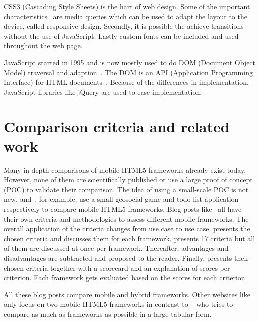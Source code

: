 \documentclass[a4paper]{artikel3}
\begin{document}
CSS3 (Cascading Style Sheets) is the hart of web design.
Some of the important characteristics~\cite{MacDonald2011} are media queries which can be used to adapt the layout to the device, called responsive design.
Secondly, it is possible the achieve transitions without the use of JavaScript.
Lastly custom fonts can be included and used throughout the web page.

JavaScript started in 1995 and is now mostly used to do DOM (Document Object Model) traversal and adaption~\cite{PhilDutson2012}.
The DOM is an API (Application Programming Interface) for HTML documents~\cite{Hegaret2004}.
Because of the differences in implementation, JavaScript libraries like jQuery are used to ease implementation.

\section{Comparison criteria and related work}
\label{sec:comparisoncriteria}

Many in-depth comparisons of mobile HTML5 frameworks already exist today.  
However, none of them are scientifically published or use a large proof of concept (POC) to validate their comparison.  
The idea of using a small-scale POC is not new.  
\cite{Oeflman2011} and~\cite{Kosmaczewski2012},  for example,  use a small geosocial game and todo list application respectively to compare mobile HTML5 frameworks.
Blog posts like~\cite{Sarrafi2012a,Ayuso2012,Rozynski2011} all have their own criteria and methodologies to assess different mobile frameworks.  
The overall application of the criteria changes from use case to use case.  
\cite{Rozynski2011} presents the chosen criteria and discusses them for each framework.  
\cite{Ayuso2012} presents 17 criteria but all of them are discussed at once per framework.  
Thereafter,  advantages and disadvantages are subtracted and proposed to the reader.  
Finally, \cite{Sarrafi2012a} presents their chosen criteria together with a scorecard and an explanation of scores per criterion.  
Each framework gets evaluated based on the scores for each criterion.

All these blog posts compare mobile and hybrid frameworks.  
Other websites like~\cite{Bristowe2012,Burris} only focus on two mobile HTML5 frameworks in contrast to ~\cite{Falk2011} who tries to compare as much as frameworks as possible in a large tabular form.
\end{document}
